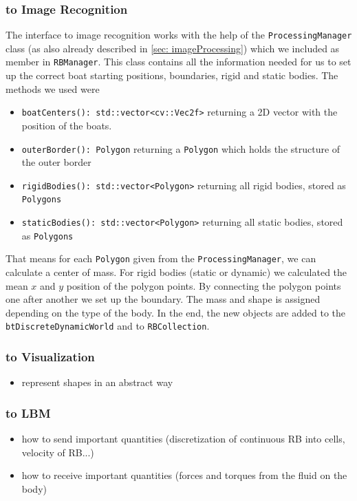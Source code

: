 \subsubsection{to Image Recognition}
The interface to image recognition works with the help of the \texttt{ProcessingManager} class (as also already described in \autoref{sec: imageProcessing}) which we included as member in \texttt{RBManager}. This class contains all the information needed for us to set up the correct boat starting positions, boundaries, rigid and static bodies. The methods we used were
\begin{itemize}
\item \texttt{boatCenters(): std::vector<cv::Vec2f>} returning a 2D vector with the position of the boats.
\item \texttt{outerBorder(): Polygon} returning a \texttt{Polygon} which holds the structure of the outer border
\item \texttt{rigidBodies(): std::vector<Polygon>} returning all rigid bodies, stored as \texttt{Polygons}
\item \texttt{staticBodies(): std::vector<Polygon>} returning all static bodies, stored as \texttt{Polygons}
\end{itemize} 
That means for each \texttt{Polygon} given from the \texttt{ProcessingManager}, we can calculate a center of mass. For rigid bodies (static or dynamic) we calculated the mean $x$ and $y$ position of the polygon points. By connecting the polygon points one after another we set up the boundary. The mass and shape is assigned depending on the type of the body. In the end, the new objects are added to the \texttt{btDiscreteDynamicWorld} and to \texttt{RBCollection}.
\subsubsection{to Visualization}
\begin{itemize}
\item represent shapes in an abstract way
\end{itemize}
\subsubsection{to LBM}
\begin{itemize}
\item how to send important quantities (discretization of continuous RB into cells, velocity of RB...)
\item how to receive important quantities (forces and torques from the fluid on the body)
\end{itemize}